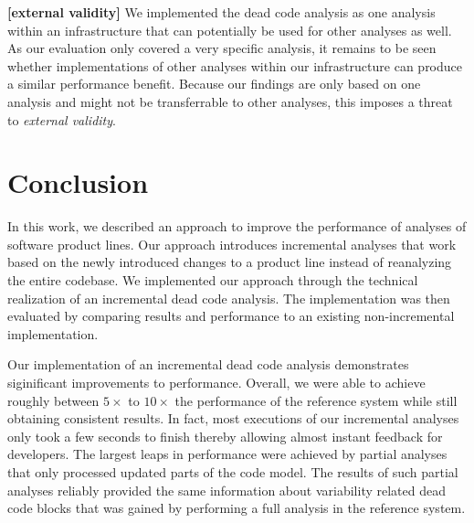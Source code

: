 \documentclass[a4paper]{article}
\begin{document}
\textbf{[external validity]} We implemented the dead code analysis as one analysis within an infrastructure that can potentially be used for other analyses as well. As our evaluation only covered a very specific analysis, it remains to be seen whether implementations of other analyses within our infrastructure can produce a similar performance benefit. Because our findings are only based on one analysis and might not be transferrable to other analyses, this imposes a threat to \emph{external validity}.


\clearpage
\newpage
\section{Conclusion}\label{conclusion}

In this work, we described an approach to improve the performance of analyses of software product lines. Our approach introduces incremental analyses that work based on the newly introduced changes to a product line instead of reanalyzing the entire codebase. We implemented our approach through the technical realization of an incremental dead code analysis. The implementation was then evaluated by comparing results and performance to an existing non-incremental implementation.

Our implementation of an incremental dead code analysis demonstrates siginificant improvements to performance. Overall, we were able to achieve roughly between $5\times$ to $10\times$ the performance of the reference system while still obtaining consistent results. 
In fact, most executions of our incremental analyses only took a few seconds to finish thereby allowing   almost instant feedback for developers. The largest leaps in performance were achieved by partial analyses that only processed updated parts of the code model. The results of such partial analyses reliably provided the same information about variability related dead code blocks that was gained by performing a full analysis in the reference system. 
\end{document}
